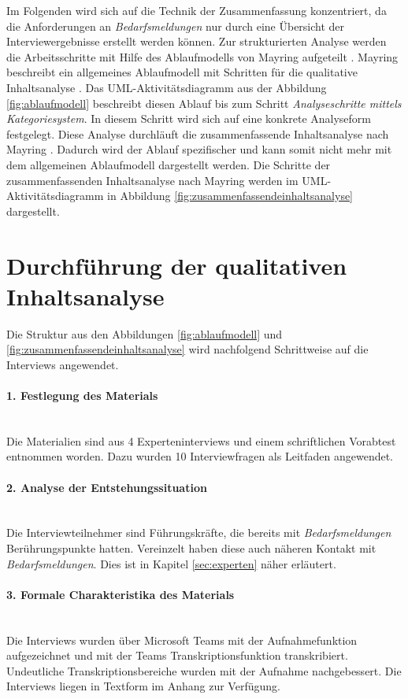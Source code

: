 Im Folgenden wird sich auf die Technik der Zusammenfassung konzentriert, da die Anforderungen an \emph{Bedarfsmeldungen} nur durch eine Übersicht der Interviewergebnisse erstellt werden können. Zur strukturierten Analyse werden die Arbeitsschritte mit Hilfe des Ablaufmodells von Mayring aufgeteilt \cite{mayring2019qualitative}.
Mayring beschreibt ein allgemeines Ablaufmodell mit Schritten für die qualitative Inhaltsanalyse \cite{mayring2019qualitative}. Das UML-Aktivitätsdiagramm aus der Abbildung \ref{fig:ablaufmodell} beschreibt diesen Ablauf bis zum Schritt \emph{Analyseschritte mittels Kategoriesystem}. In diesem Schritt wird sich auf eine konkrete Analyseform festgelegt. Diese Analyse durchläuft die zusammenfassende Inhaltsanalyse nach Mayring \cite{mayring2019qualitative}. Dadurch wird der Ablauf spezifischer und kann somit nicht mehr mit dem allgemeinen Ablaufmodell dargestellt werden. Die Schritte der zusammenfassenden Inhaltsanalyse nach Mayring werden im UML-Aktivitätsdiagramm in Abbildung \ref{fig:zusammenfassendeinhaltsanalyse} dargestellt.
\section{Durchführung der qualitativen Inhaltsanalyse}
Die Struktur aus den Abbildungen \ref{fig:ablaufmodell} und \ref{fig:zusammenfassendeinhaltsanalyse} wird nachfolgend Schrittweise auf die Interviews angewendet.
\paragraph{1. Festlegung des Materials}\mbox{} \\
Die Materialien sind aus 4 Experteninterviews und einem schriftlichen Vorabtest entnommen worden. Dazu wurden 10 Interviewfragen als Leitfaden angewendet.
\paragraph{2. Analyse der Entstehungssituation}\mbox{} \\
Die Interviewteilnehmer sind Führungskräfte, die bereits mit \emph{Bedarfsmeldungen} Berührungspunkte hatten. Vereinzelt haben diese auch näheren Kontakt mit \emph{Bedarfsmeldungen}. Dies ist in Kapitel \ref{sec:experten} näher erläutert.
\paragraph{3. Formale Charakteristika des Materials}\mbox{} \\
Die Interviews wurden über Microsoft Teams mit der Aufnahmefunktion aufgezeichnet und mit der Teams Transkriptionsfunktion transkribiert. Undeutliche Transkriptionsbereiche wurden mit der Aufnahme nachgebessert. Die Interviews liegen in Textform im Anhang zur Verfügung.
